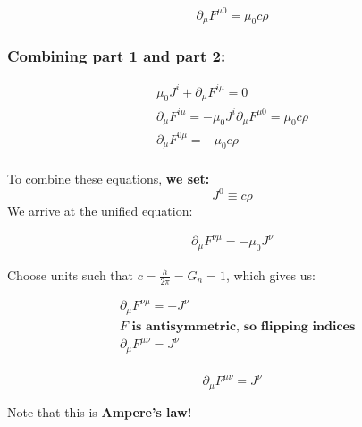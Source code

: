 \begin{equation}
    \boxed{ \partial_\mu F^{\mu0} = \mu_0 c \rho}
\end{equation}

\subsubsection{Combining part 1 and part 2:}


\begin{align*}
    \mu_0 J^i + \partial_\mu F^{i\mu} = 0 \tag{From $B$}  \\
    \partial_\mu F^{i\mu} = -\mu_0 J^i 
    \partial_\mu F^{\mu 0} = \mu_0 c \rho \\
    \partial_\mu F^{0 \mu} = - \mu_0 c \rho \\
\end{align*}

To combine these equations, \textbf{we set:}
\begin{equation}
    \boxed{J^0 \equiv c \rho}
\end{equation}
We arrive at the unified equation:

\begin{align*}
    \partial_\mu F^{\nu \mu} = - \mu_0 J^{\nu}
\end{align*}

Choose units such that $c = \frac{h}{2 \pi} = G_n = 1$, which gives us:


\begin{align*}
    &\partial_\mu F^{\nu \mu} = -  J^{\nu} \\
    &\textbf{$F$ is antisymmetric, so flipping indices} \\
    &\partial_\mu F^{\mu \nu} =  J^{\nu} \\
\end{align*}

\begin{equation}
    \boxed{ \partial_\mu F^{\mu \nu} =  J^{\nu} }
\end{equation}

Note that this is \textbf{Ampere's law!}
